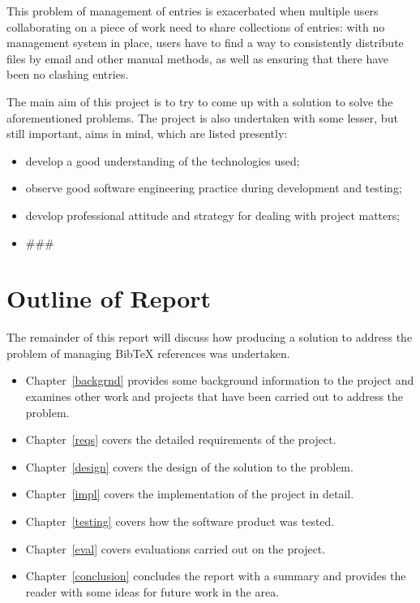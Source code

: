 \documentclass{l4proj}
\newcommand{\BibTeX}{B{\sc ib}\TeX}
\newcommand{\bibtex}{\BibTeX}
\newcommand{\revisit}{\#\#\#}
\begin{document}
This problem of management of entries is exacerbated when multiple users collaborating on a piece of work need to share collections of entries: with no management system in place, users have to find a way to consistently distribute files by email and other manual methods, as well as ensuring that there have been no clashing entries.

The main aim of this project is to try to come up with a solution to solve the aforementioned problems.  The project is also undertaken with some lesser, but still important, aims in mind, which are listed presently:
\begin{itemize}
\item develop a good understanding of the technologies used;
\item observe good software engineering practice during development and testing;
\item develop professional attitude and strategy for dealing with project matters;
\item \revisit
\end{itemize}


\section{Outline of Report}
The remainder of this report will discuss how producing a solution to address the problem of managing \bibtex{} references was undertaken. 
\begin{itemize}
\item Chapter~\ref{backgrnd} provides some background information to the project and examines other work and projects that have been carried out to address the problem.
\item Chapter~\ref{reqs} covers the detailed requirements of the project.
\item Chapter~\ref{design} covers the design of the solution to the problem.
\item Chapter~\ref{impl} covers the implementation of the project in detail.
\item Chapter~\ref{testing} covers how the software product was tested.
\item Chapter~\ref{eval} covers evaluations carried out on the project.
\item Chapter~\ref{conclusion} concludes the report with a summary and provides the reader with some ideas for future work in the area.
\end{itemize}
\end{document}
